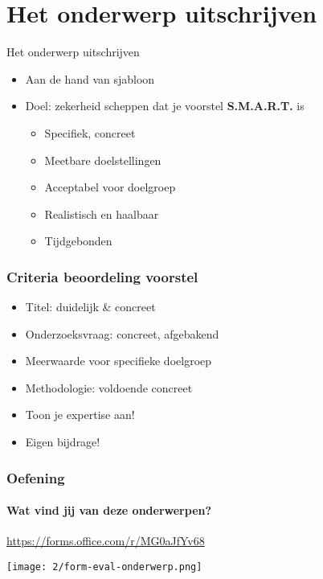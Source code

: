 \documentclass[aspectratio=169]{beamer}
\begin{document}
\section{Het onderwerp uitschrijven}

\begin{frame}{Het onderwerp uitschrijven}

  \begin{itemize}
    \item Aan de hand van sjabloon
    \item Doel: zekerheid scheppen dat je voorstel \textbf{S.M.A.R.T.} is
          \begin{itemize}
            \item Specifiek, concreet
            \item Meetbare doelstellingen
            \item Acceptabel voor doelgroep
            \item Realistisch en haalbaar
            \item Tijdgebonden
          \end{itemize}
  \end{itemize}
\end{frame}

\begin{frame}
  \frametitle{Criteria beoordeling voorstel}

  \begin{itemize}
    \item Titel: duidelijk \& concreet
    \item Onderzoeksvraag: concreet, afgebakend
    \item Meerwaarde voor specifieke doelgroep
    \item Methodologie: voldoende concreet
    \item Toon je expertise aan!
    \item Eigen bijdrage!
  \end{itemize}

\end{frame}

\begin{frame}
  \frametitle{Oefening}
  \framesubtitle{Wat vind jij van deze onderwerpen?}

  \centering

  \url{https://forms.office.com/r/MG0aJfYv68}

  \bigskip

  \texttt{[image: 2/form-eval-onderwerp.png]}

\end{frame}
\end{document}
